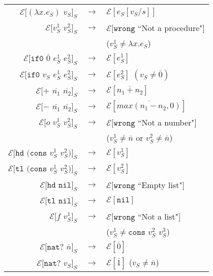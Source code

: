 \begin{figure}
\onehalfspacing
\begin{center}
\begin{tabular}{rcl}
$\mathscr{E}[(\lambda x.e_{S})$ $v_{S}]_{S}$ & $\rightarrow$ & $\mathscr{E}[e_{S}[v_{S}/s]]$ \\
$\mathscr{E}[v_{S}^{1}$ $v_{S}^{2}]_{S}$ & $\rightarrow$ & $\mathscr{E}[\mathtt{wrong}$ ``Not a procedure"$]$ \\
&& ($v_{S}^{1}\neq\lambda x.e_{S}$) \\
$\mathscr{E}[\mathtt{if0}$ $\overline{0}$ $e_{S}^{1}$ $e_{S}^{2}]_{S}$ & $\rightarrow$ & $\mathscr{E}[e_{S}^{1}]$ \\
$\mathscr{E}[\mathtt{if0}$ $v_{S}$ $e_{S}^{1}$ $e_{S}^{2}]_{S}$ & $\rightarrow$ & $\mathscr{E}[e_{S}^{2}]$ $(v_{S}\neq\overline{0})$ \\
$\mathscr{E}[+$ $\overline{n_{1}}$ $\overline{n_{2}}]_{S}$ & $\rightarrow$ & $\mathscr{E}[\overline{n_{1}+n_{2}}]$ \\
$\mathscr{E}[-$ $\overline{n_{1}}$ $\overline{n_{2}}]_{S}$ & $\rightarrow$ & $\mathscr{E}[\overline{max(n_{1}-n_{2},0)}]$ \\
$\mathscr{E}[o$ $v_{S}^{1}$ $v_{S}^{2}]_{S}$ & $\rightarrow$ & $\mathscr{E}[\mathtt{wrong}$ ``Not a number"$]$ \\
&& ($v_{S}^{1}\neq\overline{n}$ or $v_{S}^{2}\neq\overline{n}$) \\
$\mathscr{E}[\mathtt{hd}$ $(\mathtt{cons}$ $v_{S}^{1}$ $v_{S}^{2})]_{S}$ & $\rightarrow$ & $\mathscr{E}[v_{S}^{1}]$ \\
$\mathscr{E}[\mathtt{tl}$ $(\mathtt{cons}$ $v_{S}^{1}$ $v_{S}^{2})]_{S}$ & $\rightarrow$ & $\mathscr{E}[v_{S}^{2}]$ \\
$\mathscr{E}[\mathtt{hd}$ $\mathtt{nil}]_{S}$ & $\rightarrow$ & $\mathscr{E}[\mathtt{wrong}$ ``Empty list"$]$ \\
$\mathscr{E}[\mathtt{tl}$ $\mathtt{nil}]_{S}$ & $\rightarrow$ & $\mathscr{E}[\mathtt{nil}]$ \\
$\mathscr{E}[f$ $v_{S}^{1}]_{S}$ & $\rightarrow$ & $\mathscr{E}[\mathtt{wrong}$ ``Not a list"$]$ \\
&& ($v_{S}^{1}\neq\mathtt{cons}$ $v_{S}^{2}$ $v_{S}^{3}$) \\
$\mathscr{E}[\mathtt{nat?}$ $\overline{n}]_{S}$ & $\rightarrow$ & $\mathscr{E}[\overline{0}]$ \\
$\mathscr{E}[\mathtt{nat?}$ $v_{S}]_{S}$ & $\rightarrow$ & $\mathscr{E}[\overline{1}]$ ($v_{S}\neq\overline{n}$) \\

\end{tabular}
\end{center}
\end{figure}
